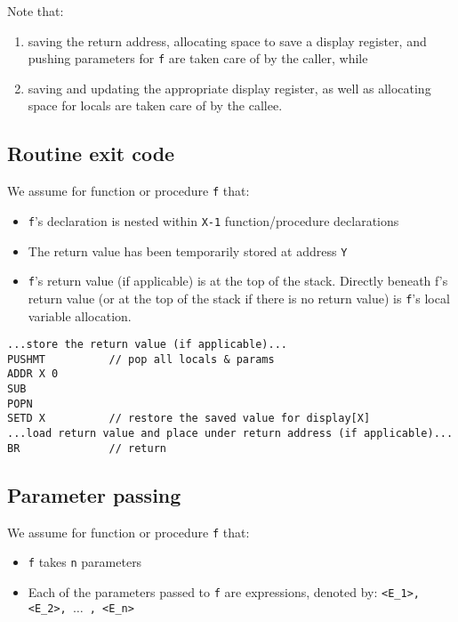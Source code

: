 \documentclass[11pt]{article}
\begin{document}
Note that:
\begin{enumerate}[label=(\arabic*)]
\item saving the return address, allocating space to save a display register, and pushing parameters for \texttt{f} are taken care of by the caller, while
\item saving and updating the appropriate display register, as well as allocating space for locals are taken care of by the callee.
\end{enumerate} 

\subsection{Routine exit code}

We assume for function or procedure \texttt{f} that:
    \begin{itemize}
    \item   \texttt{f}'s declaration is nested within \texttt{X-1} function/procedure declarations
    \item The return value has been temporarily stored at address \texttt{Y}
    \item \texttt{f}'s return value (if applicable) is at the top of the stack. Directly beneath f's return value (or at the top of the stack if there is no return value) is \texttt{f}'s local variable allocation.
    \end{itemize}
    
\begin{verbatim}
...store the return value (if applicable)...
PUSHMT          // pop all locals & params
ADDR X 0
SUB
POPN
SETD X          // restore the saved value for display[X]
...load return value and place under return address (if applicable)...
BR              // return
\end{verbatim}

\subsection{Parameter passing}

We assume for function or procedure \texttt{f} that:
    \begin{itemize}
    \item \texttt{f} takes \texttt{n} parameters
    \item Each of the parameters passed to \texttt{f} are expressions, denoted by: \texttt{<E\_1>, <E\_2>, $\ldots$ , <E\_n>}
    \end{itemize}
\end{document}
